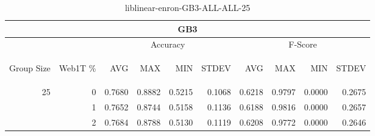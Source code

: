 \begin{center}
\begin{table}[htbp] 
 \begin{center}
\begin{tabular}{ | r | r | r | r | r | r | r | r | r | r |}
\hline
\multicolumn{10}{|c|}{GB3}\\
\hline
 & & \multicolumn{4}{|c|}{Accuracy} & \multicolumn{4}{|c|}{F-Score}\\ \cline{3-10}
\begin{sideways}Group Size\end{sideways} & \begin{sideways}Web1T \%\end{sideways} & \begin{sideways}AVG\end{sideways} & \begin{sideways}MAX\end{sideways} & \begin{sideways}MIN\end{sideways} & \begin{sideways}STDEV\end{sideways} & \begin{sideways}AVG\end{sideways} & \begin{sideways}MAX\end{sideways} & \begin{sideways}MIN\end{sideways} & \begin{sideways}STDEV\end{sideways}\\
\hline
\multirow{2}{*}{25}
 & 0 & 0.7680 & 0.8882 & 0.5215 & 0.1068 & 0.6218 & 0.9797 & 0.0000 & 0.2675\\ \cline{2-10}
 & 1 & 0.7652 & 0.8744 & 0.5158 & 0.1136 & 0.6188 & 0.9816 & 0.0000 & 0.2657\\ \cline{2-10}
 & 2 & 0.7684 & 0.8788 & 0.5130 & 0.1119 & 0.6208 & 0.9772 & 0.0000 & 0.2646\\ \cline{2-10}
\hline
\end{tabular}
\caption{liblinear-enron-GB3-ALL-ALL-25}
\label{table:liblinear-enron-GB3-ALL-ALL-25}
\end{center}
 \end{table}
\end{center}


